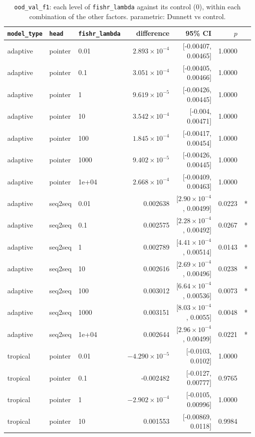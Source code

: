 \documentclass[10pt]{article}
\begin{document}
{\small
\begin{longtable}{lllrrrl}
\caption{\texttt{ood\_val\_f1}: each level of \texttt{fishr\_lambda} against its control (0), within each combination of the other factors. parametric: Dunnett vs control.}\label{tab:control-ood_val_f1}\\
\toprule
\texttt{model\_type} & \texttt{head} & \texttt{fishr\_lambda} & difference & 95\% CI & $p$ & \\
\midrule
\endhead
adaptive & pointer & 0.01 & $2.893\times10^{-4}$ & [-0.00407, 0.00465] & 1.0000 & \\
adaptive & pointer & 0.1 & $3.051\times10^{-4}$ & [-0.00405, 0.00466] & 1.0000 & \\
adaptive & pointer & 1 & $9.619\times10^{-5}$ & [-0.00426, 0.00445] & 1.0000 & \\
adaptive & pointer & 10 & $3.542\times10^{-4}$ & [-0.004, 0.00471] & 1.0000 & \\
adaptive & pointer & 100 & $1.845\times10^{-4}$ & [-0.00417, 0.00454] & 1.0000 & \\
adaptive & pointer & 1000 & $9.402\times10^{-5}$ & [-0.00426, 0.00445] & 1.0000 & \\
adaptive & pointer & 1e+04 & $2.668\times10^{-4}$ & [-0.00409, 0.00463] & 1.0000 & \\
adaptive & seq2seq & 0.01 & 0.002638 & [$2.90\times10^{-4}$, 0.00499] & 0.0223 & *\\
adaptive & seq2seq & 0.1 & 0.002575 & [$2.28\times10^{-4}$, 0.00492] & 0.0267 & *\\
adaptive & seq2seq & 1 & 0.002789 & [$4.41\times10^{-4}$, 0.00514] & 0.0143 & *\\
adaptive & seq2seq & 10 & 0.002616 & [$2.69\times10^{-4}$, 0.00496] & 0.0238 & *\\
adaptive & seq2seq & 100 & 0.003012 & [$6.64\times10^{-4}$, 0.00536] & 0.0073 & *\\
adaptive & seq2seq & 1000 & 0.003151 & [$8.03\times10^{-4}$, 0.0055] & 0.0048 & *\\
adaptive & seq2seq & 1e+04 & 0.002644 & [$2.96\times10^{-4}$, 0.00499] & 0.0221 & *\\
tropical & pointer & 0.01 & $-4.290\times10^{-5}$ & [-0.0103, 0.0102] & 1.0000 & \\
tropical & pointer & 0.1 & -0.002482 & [-0.0127, 0.00777] & 0.9765 & \\
tropical & pointer & 1 & $-2.902\times10^{-4}$ & [-0.0105, 0.00996] & 1.0000 & \\
tropical & pointer & 10 & 0.001553 & [-0.00869, 0.0118] & 0.9984 & \\

\end{longtable}}
\end{document}
